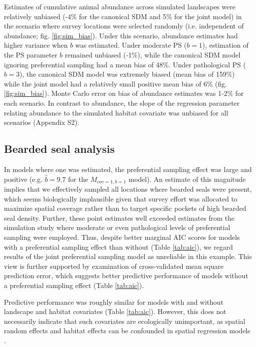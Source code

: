 \documentclass[times,mee,doublespace,]{besauth2}
\begin{document}
Estimates of cumulative animal abundance across simulated landscapes were relatively unbiased (-4\% for the canonical SDM and 5\% for the joint model) in the scenario where survey locations were selected randomly (i.e. independent of abundance; fig. \ref{fig:sim_bias}).  Under this scenario, abundance estimates had higher variance when $b$ was estimated.  Under moderate PS ($b=1$), estimation of the PS parameter $b$ remained unbiased (-1\%), while the canonical SDM model ignoring preferential sampling had a mean bias of 48\%.  Under pathological PS ($b=3$), the canonical SDM model was extremely biased (mean bias of 159\%) while the joint model had a relatively small positive mean bias of 6\% (fig. \ref{fig:sim_bias}).  Monte Carlo error on bias of abundance estimates was 1-2\% for each scenario.  In contrast to abundance, the slope of the regression parameter relating abundance to the simulated habitat covariate was unbiased for all scenarios (Appendix S2).


\subsection{Bearded seal analysis}

In models where one was estimated, the preferential sampling effect was large and positive (e.g. $\hat{b}=9.7$ for the $M_{cov=1,b=1}$ model).  An estimate of this magnitude implies that we effectively sampled all locations where bearded seals were present, which seems biologically implausible given that survey effort was allocated to maximize spatial coverage rather than to target specific pockets of high bearded seal density.  Further, these point estimates well exceeded estimates from the simulation study where moderate or even pathological levels of preferential sampling were employed.  Thus, despite better marginal AIC scores for models with a preferential sampling effect than without (Table \ref{tab:aic}), we regard results of the joint preferential sampling model as unreliable in this example.  This view is further supported by examination of cross-validated mean square prediction error, which suggests better predictive performance of models without a preferential sampling effect (Table \ref{tab:aic}).

Predictive performance was roughly similar for models with and without landscape and habitat covariates (Table \ref{tab:aic}).  However, this does not necessarily indicate that such covariates are ecologically unimportant, as spatial random effects and habitat effects can be confounded in spatial regression models \citep{HodgesReich2010}.
\end{document}
